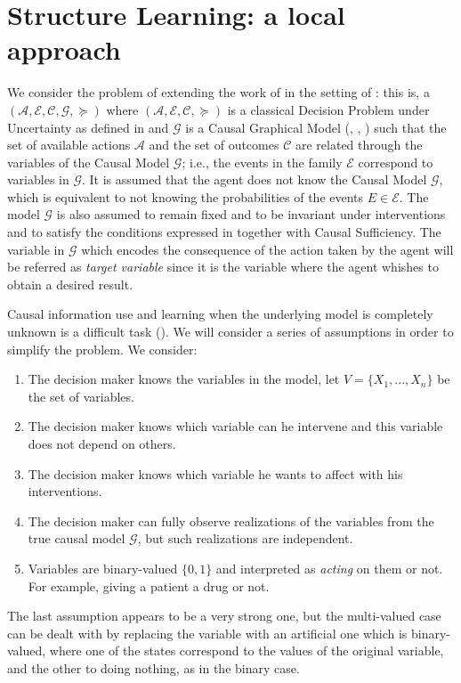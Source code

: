 \documentclass[letterpaper]{article}
\begin{document}
\section{Structure Learning: a local approach}
We consider the problem of extending the work of \cite{gonzalez2018playing} in the setting of \cite{2019arXiv190202279G}: this is, a $(\mathcal{A}, \mathcal{E}, \mathcal{C}, \mathcal{G}, \succeq)$ where $(\mathcal{A}, \mathcal{E}, \mathcal{C}, \succeq)$ is a classical Decision Problem under Uncertainty as defined in \cite{bernardo2000bayesian} and $\mathcal{G}$ is a Causal Graphical Model (\cite{spirtes2000causation}, \cite{koller2009probabilistic}, \cite{sucar2015probabilistic}) such that the set of available actions $\mathcal{A}$ and the set of outcomes $\mathcal{C}$ are related through the variables of the Causal Model $\mathcal{G}$; i.e., the events in the family $\mathcal{E}$ correspond to variables in $\mathcal{G}$. It is assumed that the agent does not know the Causal Model $\mathcal{G}$, which is equivalent to not knowing the probabilities of the events $E \in \mathcal{E}$. The model $\mathcal{G}$ is also assumed to remain fixed and to be invariant under interventions \cite{woodward2005making} and to satisfy the conditions expressed in \cite{spirtes2000causation} together with Causal Sufficiency. The variable in $\mathcal{G}$ which encodes the consequence of the action taken by the agent will be referred as \textit{target variable} since it is the variable where the agent whishes to obtain a desired result. 

Causal information use and learning when the underlying model is completely unknown is a difficult task (\cite{lattimoreNIPS2016}). We will consider a series of assumptions in order to simplify the problem. We consider:
\begin{enumerate}
\item The decision maker knows the variables in the model, let $V=\{ X_1,...,X_n \}$ be the set of variables.
\item The decision maker knows which variable can he intervene and this variable does not depend on others.
\item The decision maker knows which variable he wants to affect with his interventions. 
\item The decision maker can fully observe realizations of the variables from the true causal model $\mathcal{G}$, but such realizations are independent.
\item Variables are binary-valued $\{0,1 \}$ and interpreted as \textit{acting} on them or not. For example, giving a patient a drug or not. 
\end{enumerate}
The last assumption appears to be a very strong one, but the multi-valued case can be dealt with by replacing the variable with an artificial one which is binary-valued, where one of the states correspond to the values of the original variable, and the other to doing nothing, as in the binary case.
\end{document}
